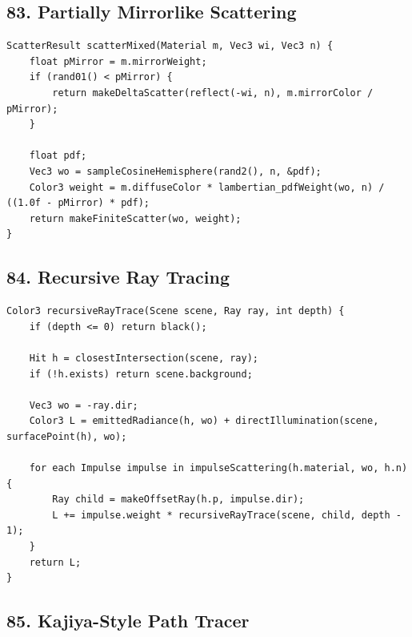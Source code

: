 \documentclass[10pt,letterpaper]{article}
\begin{document}
\subsection{83. Partially Mirrorlike Scattering}

\begin{verbatim}
ScatterResult scatterMixed(Material m, Vec3 wi, Vec3 n) {
    float pMirror = m.mirrorWeight;
    if (rand01() < pMirror) {
        return makeDeltaScatter(reflect(-wi, n), m.mirrorColor / pMirror);
    }

    float pdf;
    Vec3 wo = sampleCosineHemisphere(rand2(), n, &pdf);
    Color3 weight = m.diffuseColor * lambertian_pdfWeight(wo, n) / ((1.0f - pMirror) * pdf);
    return makeFiniteScatter(wo, weight);
}
\end{verbatim}

\subsection{84. Recursive Ray Tracing}

\begin{verbatim}
Color3 recursiveRayTrace(Scene scene, Ray ray, int depth) {
    if (depth <= 0) return black();

    Hit h = closestIntersection(scene, ray);
    if (!h.exists) return scene.background;

    Vec3 wo = -ray.dir;
    Color3 L = emittedRadiance(h, wo) + directIllumination(scene, surfacePoint(h), wo);

    for each Impulse impulse in impulseScattering(h.material, wo, h.n) {
        Ray child = makeOffsetRay(h.p, impulse.dir);
        L += impulse.weight * recursiveRayTrace(scene, child, depth - 1);
    }
    return L;
}
\end{verbatim}

\subsection{85. Kajiya-Style Path Tracer}
\end{document}
